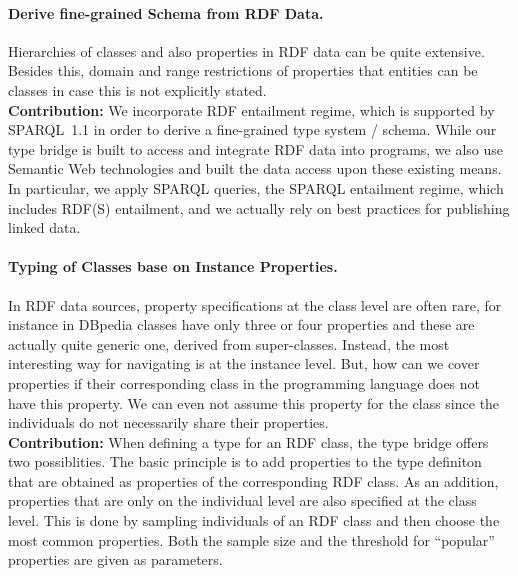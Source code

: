 \documentclass{llncs} %
\begin{document}
\paragraph*{\bf Derive fine-grained Schema from RDF Data.}
Hierarchies of classes and also properties in RDF data can be quite extensive.
Besides this, domain and range restrictions of properties that entities can be classes
in case this is not explicitly stated. \\
\textbf{Contribution:} We incorporate RDF entailment regime, which is supported by SPARQL~1.1
in order to derive a fine-grained type system / schema.
While our type bridge is built to access and integrate RDF data into programs,
we also use Semantic Web technologies and built the data access upon
these existing means. In particular, we apply SPARQL queries, the SPARQL entailment regime, which
includes RDF(S) entailment, and we actually rely on best practices for publishing linked data.


\paragraph*{\bf Typing of Classes base on Instance Properties.}
In RDF data sources, property specifications at the class level are often rare,
for instance in DBpedia classes have only three or four properties and these are actually
quite generic one, derived from super-classes. Instead, the most interesting way for navigating
is at the instance level. But, how can we cover properties if their corresponding class
in the programming language does not have this property. We can even not assume this property
for the class since the individuals do not necessarily share their properties. \\
\textbf{Contribution:}  When defining a type for an RDF class, the type bridge offers two
possiblities. The basic principle is to add properties to the type definiton that
are obtained as properties of the corresponding RDF class. As an addition,
properties that are only on the individual level are also specified at the class level.
This is done by sampling individuals of an RDF class and then choose the most common properties.
Both the sample size and the threshold for ``popular'' properties are given as parameters.

\end{document}
